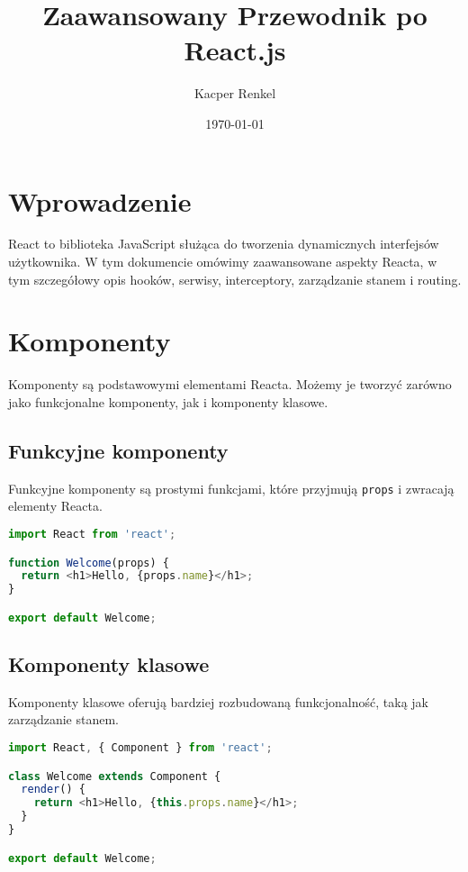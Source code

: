\documentclass[a4paper,12pt]{article}
\title{Zaawansowany Przewodnik po React.js}
\author{Kacper Renkel}
\date{\today}
\begin{document}
\maketitle

\tableofcontents
\newpage

\section{Wprowadzenie}
React to biblioteka JavaScript służąca do tworzenia dynamicznych interfejsów użytkownika. W tym dokumencie omówimy zaawansowane aspekty Reacta, w tym szczegółowy opis hooków, serwisy, interceptory, zarządzanie stanem i routing.

\section{Komponenty}
Komponenty są podstawowymi elementami Reacta. Możemy je tworzyć zarówno jako funkcjonalne komponenty, jak i komponenty klasowe.

\subsection{Funkcyjne komponenty}
Funkcyjne komponenty są prostymi funkcjami, które przyjmują \texttt{props} i zwracają elementy Reacta.

\begin{lstlisting}[language=JavaScript, caption=Prosty funkcjonalny komponent]
import React from 'react';

function Welcome(props) {
  return <h1>Hello, {props.name}</h1>;
}

export default Welcome;
\end{lstlisting}

\subsection{Komponenty klasowe}
Komponenty klasowe oferują bardziej rozbudowaną funkcjonalność, taką jak zarządzanie stanem.

\begin{lstlisting}[language=JavaScript, caption=Komponent klasowy]
import React, { Component } from 'react';

class Welcome extends Component {
  render() {
    return <h1>Hello, {this.props.name}</h1>;
  }
}

export default Welcome;
\end{lstlisting}
\end{document}

